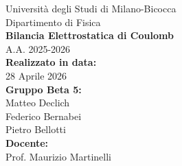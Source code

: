 \documentclass[a4paper,12pt]{article}
\begin{document}
\begin{titlepage}
    \begin{center}
        \vspace*{1cm}
        
        {\Large Università degli Studi di Milano-Bicocca}\\
        {\Large Dipartimento di Fisica }\\
        \vspace{0.5cm}
        {\Huge \textbf{Bilancia Elettrostatica di Coulomb}}\\
        
        \vspace{1.5cm}
        {\large A.A. 2025-2026}\\
        
        \vspace{2cm}
        {\large \textbf{Realizzato in data:}}\\
        {\large 28 Aprile 2026}\\
        
        \vspace{1.5cm}
        {\large \textbf{Gruppo Beta 5:}}\\
        {\large Matteo Declich}\\
        {\large Federico Bernabei}\\
        {\large Pietro Bellotti}\\
        
        \vspace{1.5cm}
        {\large \textbf{Docente:}}\\
        {\large Prof. Maurizio Martinelli}\\
        
        \vfill
        \vspace{0.8cm}
        
    \end{center}
\end{titlepage}

\tableofcontents 
\newpage


\nocite{calvi2025}
\printbibliography[heading=bibintoc]
\end{document}
